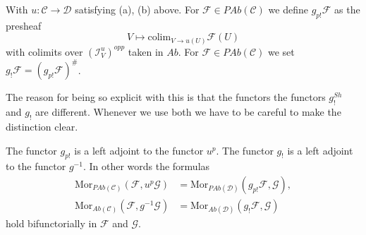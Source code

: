 \begin{definition}
\label{definition-g-shriek}
With $u : \mathcal{C} \to \mathcal{D}$ satisfying (a), (b) above.
For $\mathcal{F} \in \textit{PAb}(\mathcal{C})$ we define
{\it $g_{p!}\mathcal{F}$} as the presheaf
$$
V \longmapsto \text{colim}_{V \to u(U)} \mathcal{F}(U)
$$
with colimits over $(\mathcal{I}_V^u)^{opp}$ taken in $\textit{Ab}$. For
$\mathcal{F} \in \textit{PAb}(\mathcal{C})$ we set
{\it $g_!\mathcal{F} = (g_{p!}\mathcal{F})^\#$}.
\end{definition}

\noindent
The reason for being so explicit with this is that the functors
the functors $g^{Sh}_!$ and $g_!$ are different. Whenever we use both
we have to be careful to make the distinction clear.

\begin{lemma}
\label{lemma-g-shriek-adjoint}
The functor $g_{p!}$ is a left adjoint to the functor $u^p$.
The functor $g_!$ is a left adjoint to the functor $g^{-1}$.
In other words the formulas
\begin{align*}
\text{Mor}_{\textit{PAb}(\mathcal{C})}(\mathcal{F}, u^p\mathcal{G})
& =
\text{Mor}_{\textit{PAb}(\mathcal{D})}(g_{p!}\mathcal{F}, \mathcal{G}),\\
\text{Mor}_{\textit{Ab}(\mathcal{C})}(\mathcal{F}, g^{-1}\mathcal{G})
& =
\text{Mor}_{\textit{Ab}(\mathcal{D})}(g_!\mathcal{F}, \mathcal{G})
\end{align*}
hold bifunctorially in $\mathcal{F}$ and $\mathcal{G}$.
\end{lemma}

